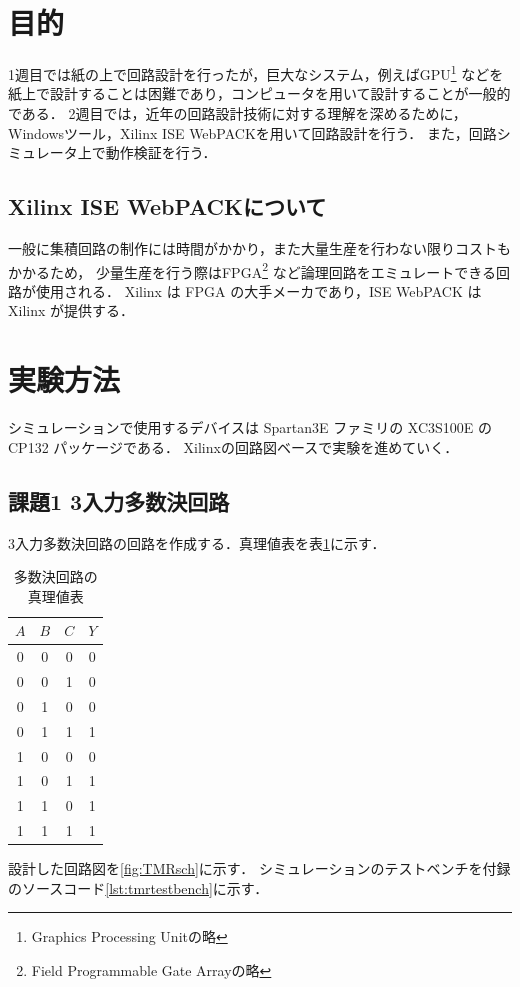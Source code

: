 \section{目的}
  1週目では紙の上で回路設計を行ったが，巨大なシステム，例えばGPU\footnote{Graphics Processing Unitの略} などを
    紙上で設計することは困難であり，コンピュータを用いて設計することが一般的である．
  2週目では，近年の回路設計技術に対する理解を深めるために，Windowsツール，Xilinx ISE WebPACKを用いて回路設計を行う．
  また，回路シミュレータ上で動作検証を行う．

  \subsection{Xilinx ISE WebPACKについて}
  一般に集積回路の制作には時間がかかり，また大量生産を行わない限りコストもかかるため，
  少量生産を行う際はFPGA\footnote{Field Programmable Gate Arrayの略} など論理回路をエミュレートできる回路が使用される．
  Xilinx は FPGA の大手メーカであり，ISE WebPACK は Xilinx が提供する．

\section{実験方法}
シミュレーションで使用するデバイスは Spartan3E ファミリの XC3S100E の CP132 パッケージである．
Xilinxの回路図ベースで実験を進めていく．
\subsection{課題1 3入力多数決回路}
3入力多数決回路の回路を作成する．真理値表を表\ref{tab:TMR}に示す．
\begin{table}[htb]
  \centering
  \caption{多数決回路の真理値表}
  \label{tab:TMR}
  \begin{tabular}{ccc|c}
    $A$ & $B$ & $C$ & $Y$ \\ \hline
     0  &  0  &  0  &  0  \\
     0  &  0  &  1  &  0  \\
     0  &  1  &  0  &  0  \\
     0  &  1  &  1  &  1  \\
     1  &  0  &  0  &  0  \\
     1  &  0  &  1  &  1  \\
     1  &  1  &  0  &  1  \\
     1  &  1  &  1  &  1  \\
  \end{tabular}
\end{table}
設計した回路図を\ref{fig:TMRsch}に示す．
シミュレーションのテストベンチを付録のソースコード\ref{lst:tmrtestbench}に示す．


